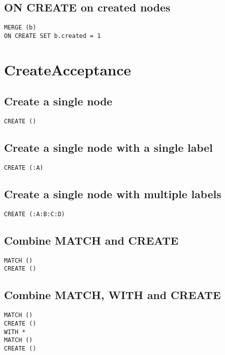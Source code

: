 \subsection{ON CREATE on created nodes}

\begin{lstlisting}
MERGE (b)
ON CREATE SET b.created = 1
\end{lstlisting}
\section{CreateAcceptance}


\subsection{Create a single node}

\begin{lstlisting}
CREATE ()
\end{lstlisting}

\subsection{Create a single node with a single label}

\begin{lstlisting}
CREATE (:A)
\end{lstlisting}

\subsection{Create a single node with multiple labels}

\begin{lstlisting}
CREATE (:A:B:C:D)
\end{lstlisting}

\subsection{Combine MATCH and CREATE}

\begin{lstlisting}
MATCH ()
CREATE ()
\end{lstlisting}

\subsection{Combine MATCH, WITH and CREATE}

\begin{lstlisting}
MATCH ()
CREATE ()
WITH *
MATCH ()
CREATE ()
\end{lstlisting}

